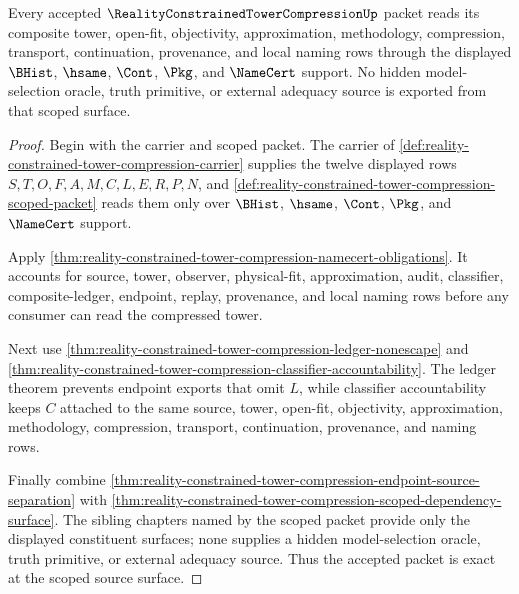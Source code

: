 \begin{theorem}
\label{thm:reality-constrained-tower-compression-scoped-source-exactness}
Every accepted $\RealityConstrainedTowerCompressionUp$ packet reads its composite tower, open-fit, objectivity, approximation, methodology, compression, transport, continuation, provenance, and local naming rows through the displayed $\BHist$, $\hsame$, $\Cont$, $\Pkg$, and $\NameCert$ support. No hidden model-selection oracle, truth primitive, or external adequacy source is exported from that scoped surface.
\end{theorem}
\begin{proof}
Begin with the carrier and scoped packet. The carrier of \autoref{def:reality-constrained-tower-compression-carrier} supplies the twelve displayed rows $S,T,O,F,A,M,C,L,E,R,P,N$, and \autoref{def:reality-constrained-tower-compression-scoped-packet} reads them only over $\BHist$, $\hsame$, $\Cont$, $\Pkg$, and $\NameCert$ support.

Apply \autoref{thm:reality-constrained-tower-compression-namecert-obligations}. It accounts for source, tower, observer, physical-fit, approximation, audit, classifier, composite-ledger, endpoint, replay, provenance, and local naming rows before any consumer can read the compressed tower.

Next use \autoref{thm:reality-constrained-tower-compression-ledger-nonescape} and \autoref{thm:reality-constrained-tower-compression-classifier-accountability}. The ledger theorem prevents endpoint exports that omit $L$, while classifier accountability keeps $C$ attached to the same source, tower, open-fit, objectivity, approximation, methodology, compression, transport, continuation, provenance, and naming rows.

Finally combine \autoref{thm:reality-constrained-tower-compression-endpoint-source-separation} with \autoref{thm:reality-constrained-tower-compression-scoped-dependency-surface}. The sibling chapters named by the scoped packet provide only the displayed constituent surfaces; none supplies a hidden model-selection oracle, truth primitive, or external adequacy source. Thus the accepted packet is exact at the scoped source surface.
\end{proof}


